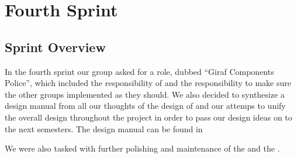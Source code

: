 \part{Fourth Sprint}
\label{par:fourth_sprint}

\chapter{Sprint Overview}
In the fourth sprint our group asked for a role, dubbed ``Giraf Components Police'', which included the responsibility of \gc and the responsibility to make sure the other groups implemented \gc as they should. We also decided to synthesize a design manual from all our thoughts of the design of \giraf and our attemps to unify the overall design throughout the project in order to pass our design ideas on to the next semesters. The design manual can be found in   


 We were also tasked with further polishing and maintenance of the \ct and the \launcher. 







